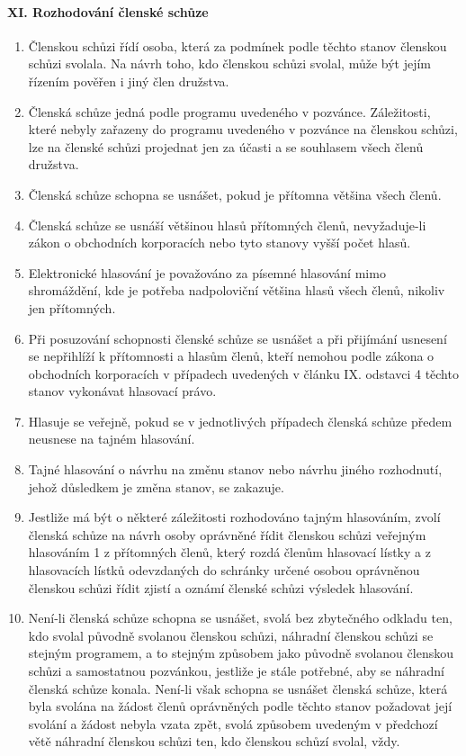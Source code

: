 \paragraph{XI. Rozhodování členské schůze}
\begin{enumerate}
    \item Členskou schůzi řídí osoba, která za podmínek podle těchto stanov členskou schůzi svolala. Na návrh toho, kdo členskou schůzi svolal, může být jejím řízením pověřen i jiný člen družstva.
    \item Členská schůze jedná podle programu uvedeného v pozvánce. Záležitosti, které nebyly zařazeny do programu uvedeného v pozvánce na členskou schůzi, lze na členské schůzi projednat jen za účasti a se souhlasem všech členů družstva.
    \item Členská schůze schopna se usnášet, pokud je přítomna většina všech členů.
    \item Členská schůze se usnáší většinou hlasů přítomných členů, nevyžaduje-li zákon o obchodních korporacích nebo tyto stanovy vyšší počet hlasů.
    \item Elektronické hlasování je považováno za písemné hlasování mimo shromáždění, kde je potřeba nadpoloviční většina hlasů všech členů, nikoliv jen přítomných.
    \item Při posuzování schopnosti členské schůze se usnášet a při přijímání usnesení se nepřihlíží k přítomnosti a hlasům členů, kteří nemohou podle zákona o obchodních korporacích v případech uvedených v článku IX. odstavci 4 těchto stanov vykonávat hlasovací právo.
    \item Hlasuje se veřejně, pokud se v jednotlivých případech členská schůze předem neusnese na tajném hlasování.
    \item Tajné hlasování o návrhu na změnu stanov nebo návrhu jiného rozhodnutí, jehož důsledkem je změna stanov, se zakazuje.
    \item Jestliže má být o některé záležitosti rozhodováno tajným hlasováním, zvolí členská schůze na návrh osoby oprávněné řídit členskou schůzi veřejným hlasováním 1 z přítomných členů, který rozdá členům hlasovací lístky a z hlasovacích lístků odevzdaných do schránky určené osobou oprávněnou členskou schůzi řídit zjistí a oznámí členské schůzi výsledek hlasování.
    \item Není-li členská schůze schopna se usnášet, svolá bez zbytečného odkladu ten, kdo svolal původně svolanou členskou schůzi, náhradní členskou schůzi se stejným programem, a to stejným způsobem jako původně svolanou členskou schůzi a samostatnou pozvánkou, jestliže je stále potřebné, aby se náhradní členská schůze konala. Není-li však schopna se usnášet členská schůze, která byla svolána na žádost členů oprávněných podle těchto stanov požadovat její svolání a žádost nebyla vzata zpět, svolá způsobem uvedeným v předchozí větě náhradní členskou schůzi ten, kdo členskou schůzí svolal, vždy.

\end{enumerate}
